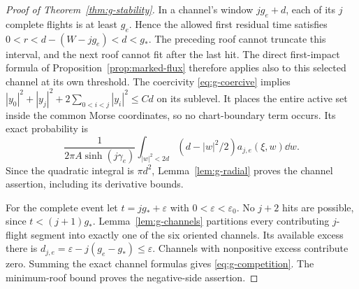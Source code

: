 \begin{proof}[Proof of Theorem~\ref{thm:g-stability}]
In a channel's window $jg_e+d$, each of its $j$ complete flights is at
least $g_e$. Hence the allowed first residual time satisfies
$0<r<d-(W-jg_e)<d<g_*$. The preceding roof cannot truncate this interval,
and the next roof cannot fit after the last hit. The direct
first-impact formula of Proposition~\ref{prop:marked-flux} therefore
applies also to this selected channel at its own threshold.
The coercivity \eqref{eq:g-coercive} implies
$|y_0|^2+|y_j|^2+2\sum_{0<i<j}|y_i|^2\le Cd$ on its sublevel.
It places the entire active set inside the common Morse coordinates,
so no chart-boundary term occurs. Its exact probability is
\[
 \frac1{2\pi A\sinh(j\gamma_e)}
 \int_{|w|^2<2d}(d-|w|^2/2)a_{j,e}(\xi,w)\dd w.
\]
Since the quadratic integral is $\pi d^2$, Lemma~\ref{lem:g-radial}
proves the channel assertion, including its derivative bounds.

For the complete event let $t=jg_*+\varepsilon$ with
$0<\varepsilon<\varepsilon_0$. No $j+2$ hits are possible, since
$t<(j+1)g_*$. Lemma~\ref{lem:g-channels} partitions every contributing
$j$-flight segment into exactly one of the six oriented channels.
Its available excess there is $d_{j,e}=\varepsilon-j(g_e-g_*)\le
\varepsilon$. Channels with nonpositive excess contribute zero.
Summing the exact channel formulas gives \eqref{eq:g-competition}.
The minimum-roof bound proves the negative-side assertion.
\end{proof}

